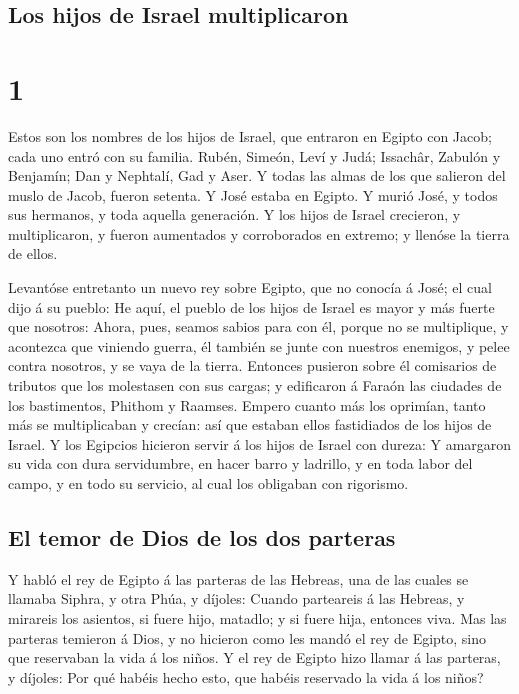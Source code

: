\hypertarget{los-hijos-de-israel-multiplicaron}{%
\subsection{Los hijos de Israel
multiplicaron}\label{los-hijos-de-israel-multiplicaron}}

\hypertarget{section}{%
\section{1}\label{section}}

 Estos son los nombres de los hijos de Israel, que
entraron en Egipto con Jacob; cada uno entró con su familia.
 Rubén, Simeón, Leví y Judá;  Issachâr,
Zabulón y Benjamín;  Dan y Nephtalí, Gad y Aser.
 Y todas las almas de los que salieron del muslo de Jacob,
fueron setenta. Y José estaba en Egipto.  Y murió José, y
todos sus hermanos, y toda aquella generación.  Y los
hijos de Israel crecieron, y multiplicaron, y fueron aumentados y
corroborados en extremo; y llenóse la tierra de ellos.

 Levantóse entretanto un nuevo rey sobre Egipto, que no
conocía á José; el cual dijo á su pueblo:  He aquí, el
pueblo de los hijos de Israel es mayor y más fuerte que nosotros:
 Ahora, pues, seamos sabios para con él, porque no se
multiplique, y acontezca que viniendo guerra, él también se junte con
nuestros enemigos, y pelee contra nosotros, y se vaya de la tierra.
 Entonces pusieron sobre él comisarios de tributos que
los molestasen con sus cargas; y edificaron á Faraón las ciudades de los
bastimentos, Phithom y Raamses.  Empero cuanto más los
oprimían, tanto más se multiplicaban y crecían: así que estaban ellos
fastidiados de los hijos de Israel.  Y los Egipcios
hicieron servir á los hijos de Israel con dureza:  Y
amargaron su vida con dura servidumbre, en hacer barro y ladrillo, y en
toda labor del campo, y en todo su servicio, al cual los obligaban con
rigorismo.

\hypertarget{el-temor-de-dios-de-los-dos-parteras}{%
\subsection{El temor de Dios de los dos
parteras}\label{el-temor-de-dios-de-los-dos-parteras}}

 Y habló el rey de Egipto á las parteras de las Hebreas,
una de las cuales se llamaba Siphra, y otra Phúa, y díjoles:
 Cuando parteareis á las Hebreas, y mirareis los
asientos, si fuere hijo, matadlo; y si fuere hija, entonces viva.
 Mas las parteras temieron á Dios, y no hicieron como les
mandó el rey de Egipto, sino que reservaban la vida á los niños.
 Y el rey de Egipto hizo llamar á las parteras, y
díjoles: Por qué habéis hecho esto, que habéis reservado la vida á los
niños?

